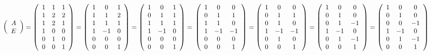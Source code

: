 $\left(\begin{array}{c}
    A \\
    E
\end{array}\right)=\left(\begin{array}{ccc}
    1 & 1 & 1 \\
    1 & 2 & 2 \\
    1 & 2 & 1 \\
    1 & 0 & 0 \\
    0 & 1 & 0 \\
    0 & 0 & 1
\end{array}\right)=\left(\begin{array}{ccc}
    1 & 0 & 1 \\
    1 & 1 & 2 \\
    1 & 1 & 1 \\
    1 & -1 & 0 \\
    0 & 0 & 0 \\
    0 & 0 & 1
\end{array}\right)=\left(\begin{array}{ccc}
    1 & 0 & 1 \\
    0 & 1 & 1 \\
    1 & 1 & 1 \\
    1 & -1 & 0 \\
    0 & 0 & 0 \\
    0 & 0 & 1
\end{array}\right)=\\\left(\begin{array}{ccc}
    1 & 0 & 0 \\
    0 & 1 & 1 \\
    1 & 1 & 0 \\
    1 & -1 & -1 \\
    0 & 0 & 0 \\
    0 & 0 & 1
\end{array}\right)=\left(\begin{array}{ccc}
    1 & 0 & 0 \\
    0 & 1 & 1 \\
    0 & 1 & 0 \\
    1 & -1 & -1 \\
    0 & 1 & 0 \\
    0 & 0 & 1
\end{array}\right)=\left(\begin{array}{ccc}
    1 & 0 & 0 \\
    0 & 1 & 0 \\
    0 & 1 & -1 \\
    1 & -1 & 0 \\
    0 & 1 & -1 \\
    0 & 0 & 1
\end{array}\right)=\left(\begin{array}{ccc}
    1 & 0 & 0 \\
    0 & 1 & 0 \\
    0 & 0 & -1 \\
    1 & -1 & 0 \\
    0 & 1 & -1 \\
    0 & 0 & 1
\end{array}\right)$

